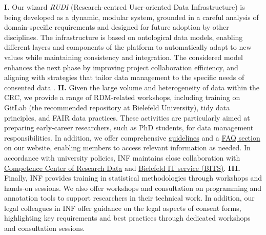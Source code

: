 \documentclass{eceasst}
\begin{document}
\textbf{I.} Our wizard \textit{RUDI} (Research-centred User-oriented Data Infrastructure) is being developed as a dynamic, modular system, grounded in a careful analysis of domain-specific requirements and designed for future adoption by other disciplines.
The infrastructure is based on ontological data models, enabling different layers and components of the platform to automatically adapt to new values while maintaining consistency and integration.
The considered model enhances the next phase by improving project collaboration efficiency, and aligning with strategies that tailor data management to the specific needs of consented data \cite{Mohammadietal2026}. %
\textbf{II.} Given the large volume and heterogeneity of data within the CRC, we provide a range of RDM-related workshops, including training on GitLab (the recommended repository at Bielefeld University), tidy data principles, and FAIR data practices. These activities are particularly aimed at preparing early-career researchers, such as PhD students, for data management responsibilities. In addition, we offer comprehensive \href{https://crc1646.pages.ub.uni-bielefeld.de/inf/website/wiki/site/index.html}{guidelines} and a \href{https://crc1646.pages.ub.uni-bielefeld.de/inf/website/faq.html}{FAQ section} on our website, enabling members to access relevant information as needed. In accordance with university policies, INF maintains close collaboration with \href{https://www.uni-bielefeld.de/ub/digital/forschungsdaten/kompetenzzentrum/}{Competence Center of Research Data} and \href{https://www.uni-bielefeld.de/einrichtungen/bits/ueber-uns/index.xml}{Bielefeld IT service (BITS)}. 
\textbf{III.} Finally, INF provides training in statistical methodologies through workshops and hands-on sessions. We also offer workshops and consultation on programming and annotation tools to support researchers in their technical work. In addition, our legal colleagues in INF offer guidance on the legal aspects of consent forms, highlighting key requirements and best practices through dedicated workshops and consultation sessions.
\end{document}
